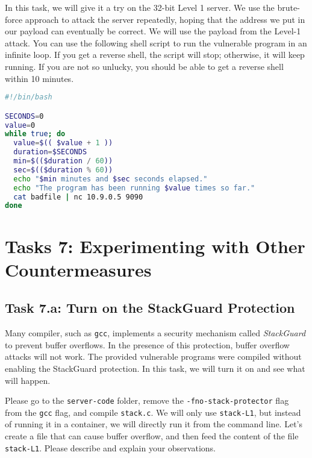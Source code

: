In this task, we will give it a try on the 32-bit Level 1 server. 
We use the brute-force approach to attack the server repeatedly, hoping that 
the address we put in our payload can eventually be correct. 
We will use the payload from the Level-1 attack. 
You can use the following shell script to run the vulnerable program in an infinite loop. 
If you get a reverse shell, the script will stop; otherwise, it will keep running. 
If you are not so unlucky, you should be able to get a reverse shell within 10 minutes. 


\begin{lstlisting}[language=bash]
#!/bin/bash

SECONDS=0
value=0
while true; do
  value=$(( $value + 1 ))
  duration=$SECONDS
  min=$(($duration / 60))
  sec=$(($duration % 60))
  echo "$min minutes and $sec seconds elapsed."
  echo "The program has been running $value times so far."
  cat badfile | nc 10.9.0.5 9090
done
\end{lstlisting}



\section{Tasks 7: Experimenting with Other Countermeasures}

\subsection{Task 7.a: Turn on the StackGuard Protection}

Many compiler, such as \texttt{gcc}, implements a security mechanism called
\textit{StackGuard} to prevent buffer overflows. In the presence of this
protection, buffer overflow attacks will not work.
The provided vulnerable programs were compiled without 
enabling the StackGuard protection.
In this task, we will turn it on and see what will happen.


Please go to the \texttt{server-code} folder, remove the 
\texttt{-fno-stack-protector} flag from the 
\texttt{gcc} flag, and compile \texttt{stack.c}. 
We will only use \texttt{stack-L1}, but 
instead of running it in a container, we will directly 
run it from the command line. Let's create a file
that can cause buffer overflow, and then feed the 
content of the file \texttt{stack-L1}. Please 
describe and explain your observations. 


